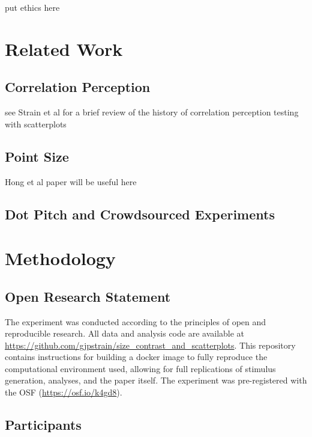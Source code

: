 \documentclass{vgtc}                          %
\begin{document}
put ethics here

\hypertarget{related-work}{%
\section{Related Work}\label{related-work}}

\hypertarget{correlation-perception}{%
\subsection{Correlation Perception}\label{correlation-perception}}

see Strain et al for a brief review of the history of correlation perception
testing with scatterplots

\hypertarget{point-size}{%
\subsection{Point Size}\label{point-size}}

Hong et al paper will be useful here

\hypertarget{dot-pitch-and-crowdsourced-experiments}{%
\subsection{Dot Pitch and Crowdsourced Experiments}\label{dot-pitch-and-crowdsourced-experiments}}

\hypertarget{methodology}{%
\section{Methodology}\label{methodology}}

\hypertarget{open-research-statement}{%
\subsection{Open Research Statement}\label{open-research-statement}}

The experiment was conducted according to the principles of open and reproducible research.
All data and analysis code are available at \url{https://github.com/gjpstrain/size_contrast_and_scatterplots}.
This repository contains instructions for building a docker image to fully
reproduce the computational environment used, allowing for full replications
of stimulus generation, analyses, and the paper itself. The experiment was
pre-registered with the OSF (\url{https://osf.io/k4gd8}).

\hypertarget{participants}{%
\subsection{Participants}\label{participants}}
\end{document}
